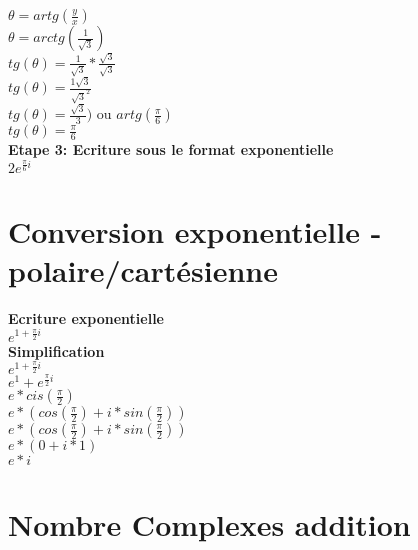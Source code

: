 $\theta = artg(\frac{y}{x})$ \\

$\theta = arctg(\frac{1}{\sqrt{3}})$ \\

$tg(\theta) = \frac{1}{\sqrt{3}} * \frac{\sqrt{3}}{\sqrt{3}}$ \\

$tg(\theta) = \frac{1\sqrt{3}}{\sqrt{3}^{2}}$ \\

$tg(\theta) = \frac{\sqrt{3}}{3})$ ou $artg(\frac{\pi}{6}) $ \\

$tg(\theta) = \frac{\pi}{6} $ \\


\vspace{5mm}
\textbf{Etape 3: Ecriture sous le format exponentielle} \\

$2e^{\frac{\pi}{6}i}$


\newpage
\section{Conversion exponentielle - polaire/cartésienne }
\vspace{3mm} %

\textbf{Ecriture exponentielle} \\

$e^{1+\frac{\pi}{2}i}$ \\

\textbf{Simplification} \\

$e^{1+\frac{\pi}{2}i}$ \\

$e^{1} + e^{\frac{\pi}{2}i}$ \\

$e*cis(\frac{\pi}{2})$ \\

$e*(cos(\frac{\pi}{2}) + i*sin(\frac{\pi}{2})) $ \\

$e*(cos(\frac{\pi}{2}) + i*sin(\frac{\pi}{2})) $ \\

$e*(0 + i*1) $ \\

$e*i $ \\


\newpage
\section{Nombre Complexes addition}
\vspace{3mm} %

